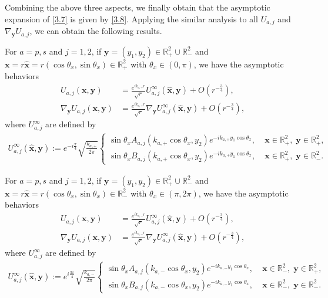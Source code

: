 \documentclass[final,reqno]{siamltex}
\newcommand{\mat}{\mathbb}
\newcommand{\R}{{\mat R}}
\newcommand{\ben}{\begin{eqnarray*}}
\newcommand{\enn}{\end{eqnarray*}}
\begin{document}
Combining the above three aspects, we finally obtain that the asymptotic expansion of \eqref{3.7} is given by \eqref{3.8}. Applying the similar analysis to all $U_{a,j}$ and $\nabla_{\mathbf{y}}U_{a,j}$, we can obtain the following results. 
\begin{theorem}\label{thm3.2}
	For $a=p,s$ and $j=1,2$, if $\mathbf{y}=(y_1,y_2)\in\R^2_+\cup\R^2_-$ and $\mathbf{x}=r\hat{\mathbf{x}}=r(\cos\theta_x,\sin\theta_x)\in \R^2_+$ with $\theta_x\in(0,\pi)$, we have the asymptotic behaviors
	\begin{align*}
	  U_{a,j}(\mathbf{x},\mathbf{y})&=\frac{e^{ik_{a,+}r}}{\sqrt{r}}U_{a,j}^\infty(\hat{\mathbf{x}},\mathbf{y})+O(r^{-\frac{3}{4}}), \\
	  \nabla_{\mathbf{y}}U_{a,j}(\mathbf{x},\mathbf{y})&=\frac{e^{ik_{a,+}r}}{\sqrt{r}}\nabla_{\mathbf{y}}U_{a,j}^\infty(\hat{\mathbf{x}},\mathbf{y})+O(r^{-\frac{3}{4}}), 
	\end{align*}
	where $U_{a,j}^\infty$ are defined by 
	\ben
	U_{a,j}^\infty(\hat{\mathbf{x}},\mathbf{y}):=e^{-i\frac{\pi}{4}}\sqrt{\frac{k_{a,+}}{2\pi}}
	\left\{
	\begin{array}{ll}
		\sin\theta_xA_{a,j}(k_{a,+}\cos\theta_x,y_2)e^{-ik_{a,+}y_1\cos\theta_x},\;&\mathbf{x}\in\R^2_+,\;\mathbf{y}\in\R^2_+,\\
		\sin\theta_xB_{a,j}(k_{a,+}\cos\theta_x,y_2)e^{-ik_{a,+}y_1\cos\theta_x},\;&\mathbf{x}\in\R^2_+,\;\mathbf{y}\in\R^2_-. 
	\end{array}
	\right.
	\enn
\end{theorem}
\begin{theorem}\label{thm3.3}
	For $a=p,s$ and $j=1,2$, if $\mathbf{y}=(y_1,y_2)\in\R^2_+\cup\R^2_-$ and $\mathbf{x}=r\hat{\mathbf{x}}=r(\cos\theta_x,\sin\theta_x)\in \R^2_-$ with $\theta_x\in(\pi,2\pi)$, we have the asymptotic behaviors 
	\begin{align*}
	U_{a,j}(\mathbf{x},\mathbf{y})&=\frac{e^{ik_{a,-}r}}{\sqrt{r}}U_{a,j}^\infty(\hat{\mathbf{x}},\mathbf{y})+O(r^{-\frac{3}{4}}), \\
	\nabla_{\mathbf{y}}U_{a,j}(\mathbf{x},\mathbf{y})&=\frac{e^{ik_{a,-}r}}{\sqrt{r}}\nabla_{\mathbf{y}}U_{a,j}^\infty(\hat{\mathbf{x}},\mathbf{y})+O(r^{-\frac{3}{4}}), 
	\end{align*}
	where $U_{a,j}^\infty$ are defined by 
	\ben
	U_{a,j}^\infty(\hat{\mathbf{x}},\mathbf{y}):=e^{i\frac{3\pi}{4}}\sqrt{\frac{k_{a,-}}{2\pi}}
	\left\{
	\begin{array}{ll}
		\sin\theta_xA_{a,j}(k_{a,-}\cos\theta_x,y_2)e^{-ik_{a,-}y_1\cos\theta_x},\;&\mathbf{x}\in\R^2_-,\;\mathbf{y}\in\R^2_+,\\
		\sin\theta_xB_{a,j}(k_{a,-}\cos\theta_x,y_2)e^{-ik_{a,-}y_1\cos\theta_x},\;&\mathbf{x}\in\R^2_-,\;\mathbf{y}\in\R^2_-. 
	\end{array}
	\right.
	\enn
\end{theorem}
\end{document}
